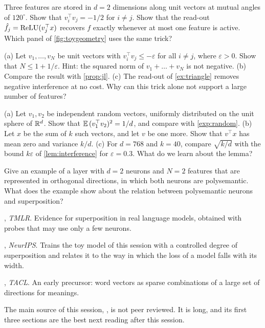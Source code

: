 \begin{exercise}\label{ex:triangle}
Three features are stored in $d=2$ dimensions along unit vectors at mutual angles of $120^\circ$. Show that
$v_i^\top v_j=-1/2$ for $i\ne j$. Show that the read-out $\hat f_j=\mathrm{ReLU}(v_j^\top x)$ recovers $f$ exactly whenever
at most one feature is active. Which panel of \cref{fig:toygeometry} uses the same trick?
\end{exercise}

\begin{exercise}\label{ex:negative}
(a) Let $v_1,\dots,v_N$ be unit vectors with $v_i^\top v_j\le-\varepsilon$ for all $i\ne j$, where
$\varepsilon>0$. Show that $N\le1+1/\varepsilon$. Hint: the squared norm of $v_1+\dots+v_N$ is not negative.
(b) Compare the result with \cref{prop:jl}. (c) The read-out of \cref{ex:triangle} removes negative interference
at no cost. Why can this trick alone not support a large number of features?
\end{exercise}

\begin{exercise}\label{ex:typical}
(a) Let $v_1,v_2$ be independent random vectors, uniformly distributed on the unit sphere of $\mathbb{R}^d$. Show that
$\mathbb{E}\,(v_1^\top v_2)^2=1/d$, and compare with \cref{exp:random}. (b) Let $x$ be the sum of $k$ such vectors, and
let $v$ be one more. Show that $v^\top x$ has mean zero and variance $k/d$. (c) For $d=768$ and $k=40$, compare
$\sqrt{k/d}$ with the bound $k\varepsilon$ of \cref{lem:interference} for $\varepsilon=0.3$. What do we learn
about the lemma?
\end{exercise}

\begin{exercise}\label{ex:polysem}
Give an example of a layer with $d=2$ neurons and $N=2$ features that are represented in orthogonal directions,
in which both neurons are polysemantic. What does the example show about the relation between polysemantic
neurons and superposition?
\end{exercise}

\begin{readinglist}
\item \citet{gurnee2023finding}, \emph{TMLR}. Evidence for superposition in real language models, obtained with
probes that may use only a few neurons.
\item \citet{liu2025superposition}, \emph{NeurIPS}. Trains the toy model of this session with a controlled degree
of superposition and relates it to the way in which the loss of a model falls with its width.
\item \citet{arora2018linear}, \emph{TACL}. An early precursor: word vectors as sparse combinations of a large set
of directions for meanings.
\item The main source of this session, \citet{elhage2022toy}, is not peer reviewed. It is long, and its first
three sections are the best next reading after this session.
\end{readinglist}
